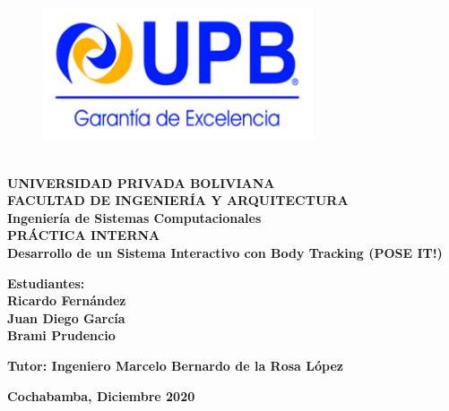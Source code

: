 \begin{titlepage}
	\makeatletter
	\setlength{\@fptop}{0pt}
	\makeatother
\begin{figure}[t!]
	\centering
	\includegraphics[width=8cm,height=5cm,]{./Images/Logo_Upb.png}
\end{figure}
\begin{center}
	\textbf{
		\large{UNIVERSIDAD PRIVADA BOLIVIANA\\
		FACULTAD DE INGENIERÍA Y ARQUITECTURA\\
		Ingeniería de Sistemas Computacionales\\[1cm]}
		\huge{PRÁCTICA INTERNA}\\[1cm]
		\Huge{Desarrollo de un Sistema Interactivo con Body Tracking (POSE IT!)}
	}\\[1cm]
\end{center} 
\textbf{Estudiantes: \\}
\textbf{
		Ricardo Fernández\\
		Juan Diego García\\
		Brami Prudencio\\
	}
\begin{center}
		\textbf{
		Tutor:
		Ingeniero Marcelo Bernardo de la Rosa López\\[2cm]
	}
\end{center} 
	\begin{center}
		\textbf{Cochabamba, Diciembre 2020}
	\end{center}

\end{titlepage}